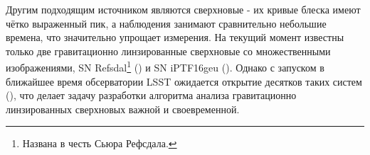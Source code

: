 Другим подходящим источником являются сверхновые - их кривые блеска имеют чётко выраженный пик, а наблюдения занимают сравнительно небольшие времена, что значительно упрощает измерения. На текущий момент известны только две гравитационно линзированные сверхновые со множественными изображениями, SN Refsdal\footnote{Названа в честь Сьюра Рефсдала.} (\cite{kelly2014}) и SN iPTF16geu (\cite{goobar2017}). Однако с запуском в ближайшее время обсерватории LSST ожидается открытие десятков таких систем (\cite{pierelrodney2019}), что делает задачу разработки алгоритма анализа гравитационно линзированных сверхновых важной и своевременной.

